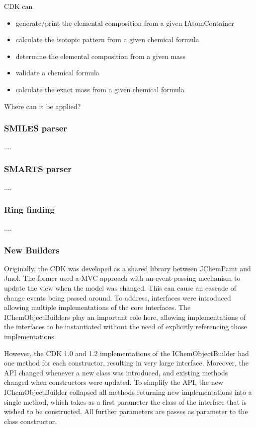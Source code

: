 \documentclass[10pt]{bmc_article}
\newenvironment{bmcformat}{\begin{raggedright}\baselineskip20pt\sloppy\setboolean{publ}{false}}{\end{raggedright}\baselineskip20pt\sloppy}
\begin{document}
\begin{bmcformat}
CDK can
\begin{itemize}
\item generate/print the elemental composition from a given IAtomContainer
\item calculate the isotopic pattern from a given chemical formula
\item determine the elemental composition from a given mass
\item validate a chemical formula
\item calculate the exact mass from a given chemical formula
\end{itemize}

Where can it be applied?

  \subsubsection*{SMILES parser}
  
  ....

  \subsubsection*{SMARTS parser}
  
  ....

  \subsubsection*{Ring finding}
  
  ....

  \subsubsection*{New Builders}

Originally, the CDK was developed as a shared library between JChemPaint and Jmol. The former
used a MVC approach with an event-passing mechanism to update the view when the model was
changed. This can cause an cascade of change events being passed around. To address,
interfaces were introduced allowing multiple implementations of the core interfaces.
The IChemObjectBuilders play an important role here, allowing implementations of the
interfaces to be instantiated without the need of explicitly referencing those implementations.

However, the CDK 1.0 and 1.2 implementations of the IChemObjectBuilder had one method for
each constructor, resulting in very large interface. Moreover, the API changed whenever
a new class was introduced, and existing methods changed when constructors were updated.
To simplify the API, the new IChemObjectBuilder collapsed all methods returning new
implementations into a single method, which takes as a first parameter the class of the
interface that is wished to be constructed. All further parameters are passes as
parameter to the class constructor.


\end{bmcformat}
\end{document}

